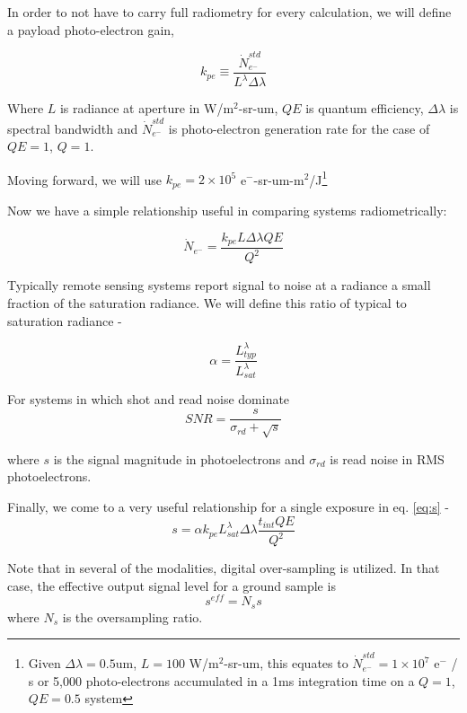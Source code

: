 \documentclass[10pt,journal]{IEEEtran}  %
\begin{document}
In order to not have to carry full radiometry for every calculation, we will define a payload photo-electron gain, 

\begin{equation}
k_{pe} \equiv \frac{\dot{N}_{e^-}^{std}}{L^\lambda\Delta \lambda}
\label{eq:k_pe}
\end{equation}

Where $L$ is radiance at aperture in W/m$^2$-sr-um, $QE$ is quantum efficiency, $\Delta \lambda$ is spectral bandwidth and $\dot{N}_{e^-}^{std}$ is photo-electron generation rate for the case of $QE=1$, $Q=1$.

Moving forward, we will use $k_{pe} = 2\times 10^5$ e$^-$-sr-um-m$^2$/J\footnote{Given $\Delta \lambda = 0.5$um, $L = 100$ W/m$^2$-sr-um, this equates to $\dot{N}_{e^-}^{std} = 1\times 10^7$ e$^-$ / s or 5,000 photo-electrons accumulated in a 1ms integration time on a $Q=1$, $QE=0.5$ system}

Now we have a simple relationship useful in comparing systems radiometrically:

\begin{equation}
\dot{N}_{e^-} = \frac{k_{pe} L \Delta \lambda QE}{Q^2}
\label{eq:N_e_dot}
\end{equation}

Typically remote sensing systems report signal to noise at a radiance a small fraction of the saturation radiance.  We will define this ratio of typical to saturation radiance - 

\begin{equation}
\alpha = \frac{L_{typ}^\lambda}{L_{sat}^\lambda}
\label{eq:alpha}
\end{equation}

For systems in which shot and read noise dominate
\begin{equation}
SNR = \frac{s}{\sigma_{rd} + \sqrt{s}}
\label{eq:snr}
\end{equation}

where $s$ is the signal magnitude in photoelectrons and $\sigma_{rd}$ is read noise in RMS photoelectrons.

Finally, we come to a very useful relationship for a single exposure in eq. \ref{eq:s} -
\begin{equation}
s = \alpha k_{pe}L_{sat}^\lambda\Delta \lambda \frac{t_{int}QE}{Q^2}
\label{eq:s}
\end{equation}

Note that in several of the modalities, digital over-sampling is utilized.  In that case, the effective output signal level for a ground sample is 
$$s^{eff} = N_s s$$
where $N_s$ is the oversampling ratio.
\end{document}
